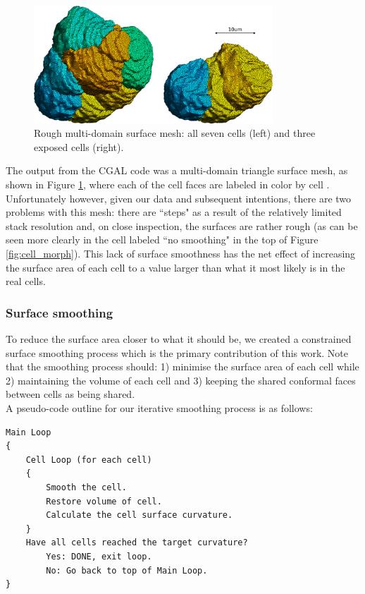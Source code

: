 \documentclass[a4paper,10pt]{article}
\begin{document}
\begin{figure}[H]
\begin{center}
\includegraphics[width=0.8\textwidth]{images/rough.pdf}
\end{center}
\caption{Rough multi-domain surface mesh: all seven cells (left) and three exposed cells (right).}
\label{fig:rough}
\end{figure}

The output from the CGAL code was a multi-domain triangle surface mesh, as shown in Figure \ref{fig:rough}, where each of the cell faces are labeled in color by cell . Unfortunately however, given our data and subsequent intentions, there are two problems with this mesh: there are ``steps" as a result of the relatively limited stack resolution and, on close inspection, the surfaces are rather rough (as can be seen more clearly in the cell labeled ``no smoothing" in the top of Figure \ref{fig:cell_morph}). This lack of surface smoothness has the net effect of increasing the surface area of each cell to a value larger than what it most likely is in the real cells.\\

\subsubsection{Surface smoothing}

To reduce the surface area closer to what it should be, we created a constrained surface smoothing process which is the primary contribution of this work. Note that the smoothing process should: 1) minimise the surface area of each cell while 2) maintaining the volume of each cell and 3) keeping the shared conformal faces between cells as being shared.\\

A pseudo-code outline for our iterative smoothing process is as follows:
\begin{verbatim}
Main Loop
{
    Cell Loop (for each cell)
    {
        Smooth the cell.
        Restore volume of cell.
        Calculate the cell surface curvature.
    }
    Have all cells reached the target curvature?
        Yes: DONE, exit loop.
        No: Go back to top of Main Loop.  
}
\end{verbatim}
\end{document}

